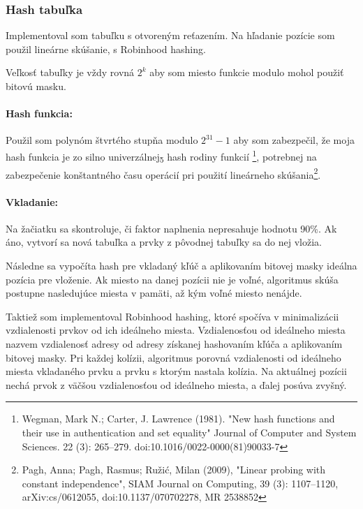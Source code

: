 \documentclass[a4paper,slovak,12pt]{article}
\begin{document}
    \subsubsection{Hash tabuľka}\label{subsubsec:hash-tabulka-s-retazenim}

    Implementoval som tabuľku s otvoreným reťazením.
    Na hľadanie pozície som použil lineárne skúšanie, s Robinhood hashing.

    Veľkosť tabuľky je vždy rovná $2^k$ aby som miesto funkcie modulo mohol použiť bitovú masku.

    \paragraph{Hash funkcia:}
    Použil som polynóm štvrtého stupňa modulo $2^{31}-1$ aby som zabezpečil, že moja hash funkcia je zo
    silno univerzálnej\textsubscript{5} hash rodiny funkcií
    \footnote{Wegman, Mark N.; Carter, J. Lawrence (1981). "New hash functions and their
    use in authentication and set equality"  Journal of Computer and System Sciences. 22 (3): 265–279. doi:10.1016/0022-0000(81)90033-7},
    potrebnej na zabezpečenie konštantného času operácií pri použití lineárneho skúšania\footnote{Pagh, Anna; Pagh, Rasmus; Ružić, Milan (2009),
        "Linear probing with constant independence",
        SIAM Journal on Computing, 39 (3): 1107–1120, arXiv:cs/0612055, doi:10.1137/070702278, MR 2538852}.\hfill

    \paragraph{Vkladanie:}
    Na žačiatku sa skontroluje, či faktor naplnenia nepresahuje hodnotu 90\%.
    Ak áno, vytvorí sa nová tabuľka a prvky z pôvodnej tabuľky sa do nej vložia.

    Následne sa vypočíta hash pre vkladaný kľúč a aplikovaním bitovej masky ideálna pozícia pre vloženie.
    Ak miesto na danej pozícii nie je voľné, algoritmus skúša postupne nasledujúce miesta v pamäti, až kým voľné miesto nenájde.

    Taktiež som implementoval Robinhood hashing, ktoré spočíva v minimalizácii vzdialenosti prvkov od ich ideálneho miesta.
    Vzdialenosťou od ideálneho miesta nazvem vzdialenosť adresy od adresy získanej hashovaním kľúča a aplikovaním bitovej masky.
    Pri každej kolízii, algoritmus porovná vzdialenosti od ideálneho miesta vkladaného prvku a prvku s ktorým nastala kolízia.
    Na aktuálnej pozícii nechá prvok z väčšou vzdialenosťou od ideálneho miesta, a ďalej posúva zvyšný.
\end{document}
